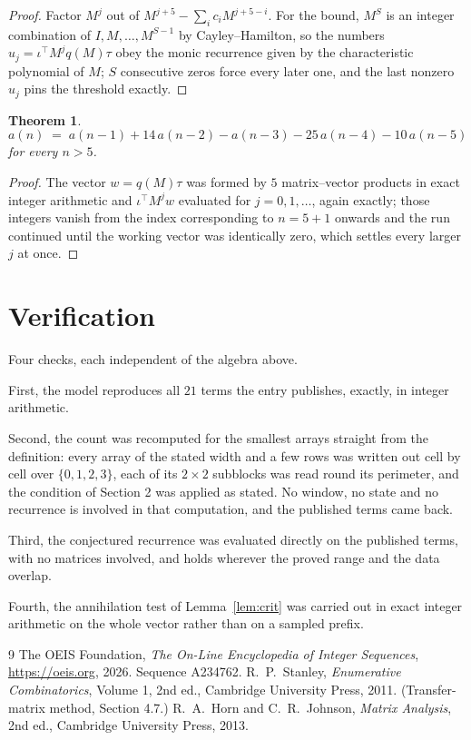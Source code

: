 \documentclass[11pt,a4paper]{article}
\theoremstyle{plain}
\newtheorem{theorem}{Theorem}
\theoremstyle{definition}
\begin{document}
\begin{proof}
Factor $M^{j}$ out of $M^{j+5}-\sum_ic_iM^{j+5-i}$. For the bound, $M^{S}$
is an integer combination of $I,M,\dots,M^{S-1}$ by Cayley--Hamilton, so the numbers
$u_j=\iota^{\!\top}M^{j}q(M)\tau$ obey the monic recurrence given by the characteristic
polynomial of $M$; $S$ consecutive zeros force every later one, and the last nonzero $u_j$
pins the threshold exactly.
\end{proof}

\begin{theorem}
\[
a(n)\;=\;a(n-1) + 14\,a(n-2) - a(n-3) - 25\,a(n-4) - 10\,a(n-5)
\]
for every $n>5$.
\end{theorem}

\begin{proof}
The vector $w=q(M)\tau$ was formed by $5$ matrix--vector products in exact integer
arithmetic and $\iota^{\!\top}M^{j}w$ evaluated for $j=0,1,\dots$, again exactly; those
integers vanish from the index corresponding to $n=5+1$ onwards and the run continued
until the working vector was identically zero, which settles every larger $j$ at once.
\end{proof}

\section{Verification}

Four checks, each independent of the algebra above.

First, the model reproduces all $21$ terms the entry publishes, exactly, in integer
arithmetic.

Second, the count was recomputed for the smallest arrays straight from the definition: every
array of the stated width and a few rows was written out cell by cell over $\{0,1,2,3\}$, each of
its $2\times2$ subblocks was read round its perimeter, and the condition of Section 2 was
applied as stated. No window, no state and no recurrence is involved in that computation, and
the published terms came back.

Third, the conjectured recurrence was evaluated directly on the published terms, with no
matrices involved, and holds wherever the proved range and the data overlap.

Fourth, the annihilation test of Lemma~\ref{lem:crit} was carried out in exact integer
arithmetic on the whole vector rather than on a sampled prefix.

\begin{thebibliography}{9}
 The OEIS Foundation, \emph{The On-Line Encyclopedia of Integer
Sequences}, \url{https://oeis.org}, 2026. Sequence A234762.
 R.~P.~Stanley, \emph{Enumerative Combinatorics}, Volume 1, 2nd ed.,
Cambridge University Press, 2011. (Transfer-matrix method, Section 4.7.)
 R.~A.~Horn and C.~R.~Johnson, \emph{Matrix Analysis}, 2nd ed., Cambridge
University Press, 2013.
\end{thebibliography}
\end{document}
